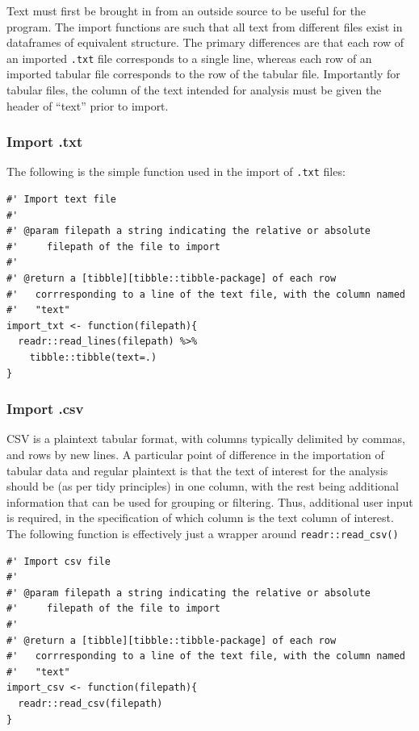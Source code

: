 \documentclass[11pt, a4paper, oneside]{report}
\begin{document}
Text must first be brought in from an outside source to be useful for
the program. The import functions are such that all text from
different files exist in dataframes of equivalent structure. The
primary differences are that each row of an imported \texttt{.txt}
file corresponds to a single line, whereas each row of an imported
tabular file corresponds to the row of the tabular file. Importantly
for tabular files, the column of the text intended for analysis must
be given the header of ``text'' prior to import.

\subsubsection{Import .txt}
\label{sec:org0ff5f7d}
The following is the simple function used in the import of \texttt{.txt} files:
\begin{verbatim}
#' Import text file 
#'
#' @param filepath a string indicating the relative or absolute
#'     filepath of the file to import
#' 
#' @return a [tibble][tibble::tibble-package] of each row
#'   corrresponding to a line of the text file, with the column named
#'   "text"
import_txt <- function(filepath){
  readr::read_lines(filepath) %>%
    tibble::tibble(text=.)
}
\end{verbatim}
\subsubsection{Import .csv}
\label{sec:orgb2d558e}
CSV is a plaintext tabular format, with columns typically delimited by
commas, and rows by new lines. A particular point of difference in the
importation of tabular data and regular plaintext is that the text of
interest for the analysis should be (as per tidy principles) in one
column, with the rest being additional information that can be used
for grouping or filtering. Thus, additional user input is required, in
the specification of which column is the text column of interest. The
following function is effectively just a wrapper around
\texttt{readr::read_csv()}
\begin{verbatim}
#' Import csv file
#'
#' @param filepath a string indicating the relative or absolute
#'     filepath of the file to import
#'
#' @return a [tibble][tibble::tibble-package] of each row
#'   corrresponding to a line of the text file, with the column named
#'   "text"
import_csv <- function(filepath){
  readr::read_csv(filepath)
}
\end{verbatim}
\end{document}
